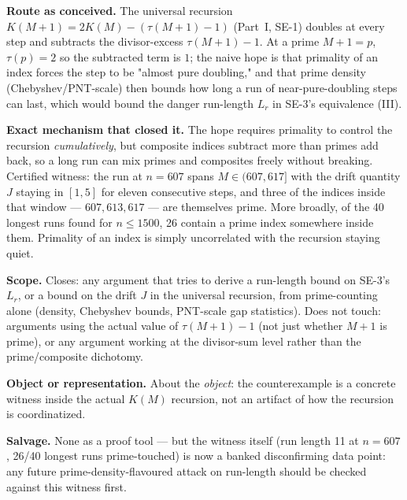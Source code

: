 \begin{obs}
\label{obs:prime-doubling}
\textbf{Route as conceived.} The universal recursion $K(M+1) = 2K(M) - (\tau(M+1)-1)$ (Part~I,
SE-1) doubles at every step and subtracts the divisor-excess $\tau(M+1)-1$. At a prime $M+1=p$,
$\tau(p)=2$ so the subtracted term is $1$; the naive hope is that primality of an index forces the
step to be "almost pure doubling," and that prime density (Chebyshev/PNT-scale) then bounds how
long a run of near-pure-doubling steps can last, which would bound the danger run-length $L_r$ in
SE-3's equivalence (III).

\textbf{Exact mechanism that closed it.} The hope requires primality to control the recursion
\emph{cumulatively}, but composite indices subtract more than primes add back, so a long run can
mix primes and composites freely without breaking. Certified witness: the run at $n=607$ spans
$M\in(607,617]$ with the drift quantity $J$ staying in $[1,5]$ for eleven consecutive steps, and
three of the indices inside that window — $607,613,617$ — are themselves prime. More broadly, of
the 40 longest runs found for $n\le 1500$, 26 contain a prime index somewhere inside them. Primality
of an index is simply uncorrelated with the recursion staying quiet.

\textbf{Scope.} Closes: any argument that tries to derive a run-length bound on SE-3's $L_r$, or a
bound on the drift $J$ in the universal recursion, from prime-counting alone (density,
Chebyshev bounds, PNT-scale gap statistics). Does not touch: arguments using the actual value of
$\tau(M+1)-1$ (not just whether $M+1$ is prime), or any argument working at the divisor-sum level
rather than the prime/composite dichotomy.

\textbf{Object or representation.} About the \emph{object}: the counterexample is a concrete
witness inside the actual $K(M)$ recursion, not an artifact of how the recursion is coordinatized.

\textbf{Salvage.} None as a proof tool — but the witness itself (run length 11 at $n=607$,
26/40 longest runs prime-touched) is now a banked disconfirming data point: any future
prime-density-flavoured attack on run-length should be checked against this witness first.
\end{obs}

